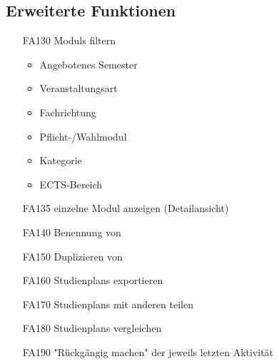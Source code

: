 	\subsection{Erweiterte Funktionen}
		\label{subsec:func_requirements-erweitert}
		\begin{itemize}[nosep]
		\item [FA130] \glspl{Modul} filtern
		\begin{itemize}
		\item Angebotenes Semester
		\item Veranstaltungsart
		\item Fachrichtung
		\item Pflicht-/Wahlmodul
		\item Kategorie
		\item ECTS-Bereich
		\end{itemize}
		\item[FA135] einzelne \gls{Modul} anzeigen (Detailansicht)
		\item [FA140]	Benennung von
		\item [FA150] Duplizieren von 
		\item [FA160] \glspl{Studienplan} exportieren
		\item [FA170] \glspl{Studienplan} mit anderen teilen
		\item[FA180] \glspl{Studienplan} vergleichen
		\item [FA190] "Rückgängig machen" der jeweils letzten Aktivität
		\end{itemize}

